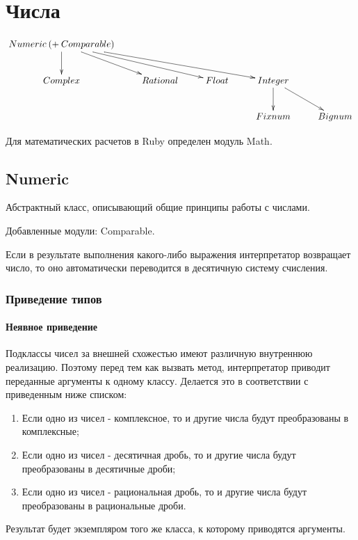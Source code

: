 \chapter{Числа}
$$
  \xymatrix{	
  Numeric \: (+ \: Comparable) \ar[d]\ar[dr]\ar[drr]\ar[drrr] &&& \\
  Complex & Rational & Float & Integer \ar[d]\ar[dr] & \\
  &&& Fixnum & Bignum }
$$

Для математических расчетов в Ruby определен модуль Math.

\section{Numeric}

Абстрактный класс, описывающий общие принципы работы с числами.

Добавленные модули: Comparable.

Если в результате выполнения какого-либо выражения интерпретатор возвращает число, то оно автоматически переводится в десятичную систему счисления.

\subsection*{Приведение типов}

\subsubsection{Неявное приведение}

Подклассы чисел за внешней схожестью имеют различную внутреннюю реализацию. Поэтому перед тем как вызвать метод, интерпретатор приводит переданные аргументы к одному классу. Делается это в соответствии с приведенным ниже списком:
\begin{enumerate}
  \item Если одно из чисел - комплексное, то и другие числа будут преобразованы в комплексные;

  \item Если одно из чисел - десятичная дробь, то и другие числа будут преобразованы в десятичные дроби;

  \item Если одно из чисел - рациональная дробь, то и другие числа будут преобразованы в рациональные дроби. 
\end{enumerate}

Результат будет экземпляром того же класса, к которому приводятся аргументы.

